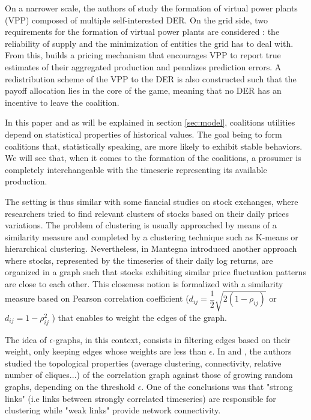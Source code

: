 \documentclass[conference]{IEEEtran}
\begin{document}
On a narrower scale, the authors of \cite{Kota2011} study the formation of virtual power plants (VPP) composed of multiple self-interested DER. On the grid side, two requirements for the formation of virtual power plants are considered : the reliability of supply and the minimization of entities the grid has to deal with. From this, \cite{Kota2011} builds a pricing mechanism that encourages VPP to report true estimates of their aggregated production and penalizes prediction errors. A redistribution scheme of the VPP to the DER is also constructed such that the payoff allocation lies in the core of the game, meaning that no DER has an incentive to leave the coalition.

In this paper and as will be explained in section \ref{sec:model}, coalitions utilities depend on statistical properties of historical values. The goal being to form coalitions that, statistically speaking, are more likely to exhibit stable behaviors. We will see that, when it comes to the formation of the coalitions, a prosumer is completely interchangeable with the timeserie representing its available production.

The setting is thus similar with some fiancial studies on stock exchanges, where researchers tried to find relevant clusters of stocks based on their daily prices variations. The problem of clustering is usually approached by means of a similarity measure and completed by a clustering technique such as K-means or hierarchical clustering. Nevertheless, in \cite{Mantegna1999} Mantegna introduced another approach where stocks, represented by the timeseries of their daily log returns, are organized in a graph such that stocks exhibiting similar price fluctuation patterns are close to each other. This closeness notion is formalized with a similarity measure based on Pearson correlation coefficient ($ d_{ij} = \dfrac{1}{2}\sqrt{2(1-\rho_{ij})} $ or $ d_{ij} = 1 - \rho_{ij}^{2} $ ) that enables to weight the edges of the graph. 

The idea of $\epsilon$-graphs, in this context, consists in filtering edges based on their weight, only keeping edges whose weights are less than $ \epsilon $. In \cite{Garas2008} and \cite{Onnela2004}, the authors studied the topological properties (average clustering, connectivity, relative number of cliques...) of the correlation graph against those of growing random graphs, depending on the threshold $ \epsilon $. One of the conclusions was that "strong links" (i.e links between strongly correlated timeseries) are responsible for clustering while "weak links" provide network connectivity.
\end{document}

